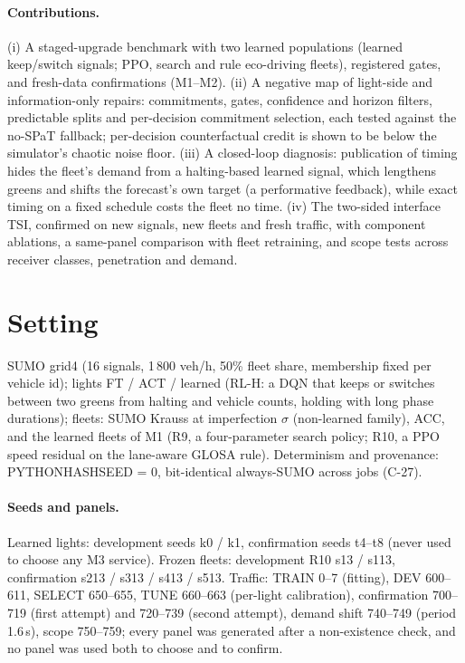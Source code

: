 \documentclass[11pt]{article}
\begin{document}
\paragraph{Contributions.}
(i) A staged-upgrade benchmark with two learned populations (learned keep/switch signals; PPO, search and rule eco-driving fleets),
registered gates, and fresh-data confirmations (M1--M2).
(ii) A negative map of light-side and information-only repairs: commitments, gates, confidence and horizon filters, predictable splits and
per-decision commitment selection, each tested against the no-SPaT fallback; per-decision counterfactual credit is shown to be below the
simulator's chaotic noise floor.
(iii) A closed-loop diagnosis: publication of timing hides the fleet's demand from a halting-based learned signal, which lengthens greens and
shifts the forecast's own target (a performative feedback), while exact timing on a fixed schedule costs the fleet no time.
(iv) The two-sided interface TSI, confirmed on new signals, new fleets and fresh traffic, with component ablations, a same-panel comparison
with fleet retraining, and scope tests across receiver classes, penetration and demand.

\section{Setting}
SUMO grid4 (16 signals, 1\,800 veh/h, 50\% fleet share, membership fixed per vehicle id); lights FT / ACT / learned (RL-H: a DQN that
keeps or switches between two greens from halting and vehicle counts, holding with long phase durations); fleets: SUMO Krauss at
imperfection $\sigma$ (non-learned family), ACC, and the learned fleets of M1 (R9, a four-parameter search policy; R10, a PPO speed
residual on the lane-aware GLOSA rule). Determinism and provenance: PYTHONHASHSEED = 0, bit-identical always-SUMO across jobs (C-27).
\paragraph{Seeds and panels.} Learned lights: development seeds k0 / k1, confirmation seeds t4--t8 (never used to choose any M3 service).
Frozen fleets: development R10 s13 / s113, confirmation s213 / s313 / s413 / s513. Traffic: TRAIN 0--7 (fitting), DEV 600--611, SELECT
650--655, TUNE 660--663 (per-light calibration), confirmation 700--719 (first attempt) and 720--739 (second attempt), demand shift
740--749 (period 1.6\,s), scope 750--759; every panel was generated after a non-existence check, and no panel was used both to choose
and to confirm.
\end{document}
